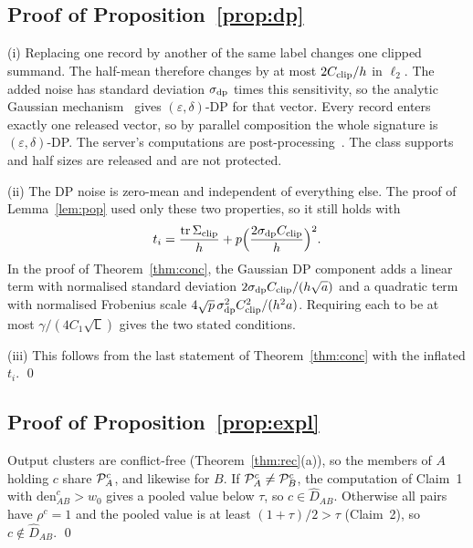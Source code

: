 \subsection{Proof of Proposition~\ref{prop:dp}}
(i) Replacing one record by another of the same label changes one clipped summand. The half-mean therefore changes by at most $2C_{\rm clip}/h$ in $\ell_2$. The added noise has standard deviation $\sigma_{\rm dp}$ times this sensitivity, so the analytic Gaussian mechanism~\citep{balle2018analytic} gives $(\varepsilon,\delta)$-DP for that vector. Every record enters exactly one released vector, so by parallel composition the whole signature is $(\varepsilon,\delta)$-DP. The server's computations are post-processing~\citep{dwork2014dp}. The class supports and half sizes are released and are not protected.

(ii) The DP noise is zero-mean and independent of everything else. The proof of Lemma~\ref{lem:pop} used only these two properties, so it still holds with
\[
t_i=\frac{\operatorname{tr}\Sigma_{\rm clip}}{h}+p\Big(\frac{2\sigma_{\rm dp}C_{\rm clip}}{h}\Big)^2.
\]
In the proof of Theorem~\ref{thm:conc}, the Gaussian DP component adds a linear term with normalised standard deviation $2\sigma_{\rm dp}C_{\rm clip}/(h\sqrt a)$ and a quadratic term with normalised Frobenius scale $4\sqrt p\,\sigma^2_{\rm dp}C^2_{\rm clip}/(h^2a)$. Requiring each to be at most $\gamma/(4C_1\sqrt{\mathsf L})$ gives the two stated conditions.

(iii) This follows from the last statement of Theorem~\ref{thm:conc} with the inflated $t_i$. \qed

\subsection{Proof of Proposition~\ref{prop:expl}}
Output clusters are conflict-free (Theorem~\ref{thm:rec}(a)), so the members of $A$ holding $c$ share $\mathcal{P}_A^c$, and likewise for $B$. If $\mathcal{P}_A^c\neq\mathcal{P}_B^c$, the computation of Claim~1 with $\mathrm{den}^c_{AB}>w_0$ gives a pooled value below $\tau$, so $c\in\hat D_{AB}$. Otherwise all pairs have $\rho^c=1$ and the pooled value is at least $(1+\tau)/2>\tau$ (Claim~2), so $c\notin\hat D_{AB}$. \qed

